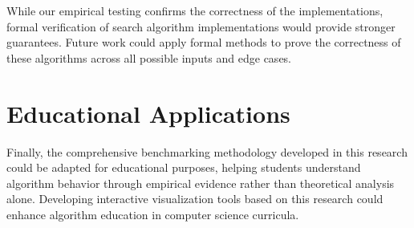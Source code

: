 While our empirical testing confirms the correctness of the implementations, formal verification of search algorithm implementations would provide stronger guarantees. Future work could apply formal methods to prove the correctness of these algorithms across all possible inputs and edge cases.

\section{Educational Applications}

Finally, the comprehensive benchmarking methodology developed in this research could be adapted for educational purposes, helping students understand algorithm behavior through empirical evidence rather than theoretical analysis alone. Developing interactive visualization tools based on this research could enhance algorithm education in computer science curricula.